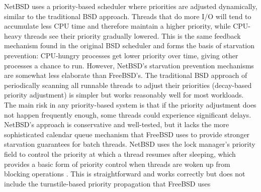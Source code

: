 NetBSD uses a priority-based scheduler where priorities are adjusted dynamically, similar to the traditional BSD approach. Threads that do more I/O will tend to accumulate less CPU time and therefore maintain a higher priority, while CPU-heavy threads see their priority gradually lowered. This is the same feedback mechanism found in the original BSD scheduler and forms the basis of starvation prevention: CPU-hungry processes get lower priority over time, giving other processes a chance to run.
However, NetBSD's starvation prevention mechanisms are somewhat less elaborate than FreeBSD's. The traditional BSD approach of periodically scanning all runnable threads to adjust their priorities (decay-based priority adjustment) is simpler but works reasonably well for most workloads. The main risk in any priority-based system is that if the priority adjustment does not happen frequently enough, some threads could experience significant delays. NetBSD's approach is conservative and well-tested, but it lacks the more sophisticated calendar queue mechanism that FreeBSD uses to provide stronger starvation guarantees for batch threads.
NetBSD uses the lock manager's priority field to control the priority at which a thread resumes after sleeping, which provides a basic form of priority control when threads are woken up from blocking operations \parencite{netBSDnd}. This is straightforward and works correctly but does not include the turnstile-based priority propagation that FreeBSD uses


